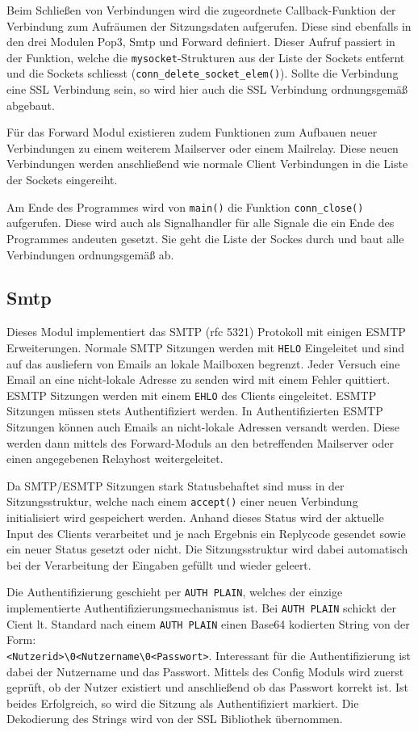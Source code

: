 \documentclass[final,a4paper,11pt,notitlepage,halfparskip]{scrreprt}
\begin{document}
Beim Schließen von Verbindungen wird die zugeordnete Callback-Funktion der
Verbindung zum Aufräumen der Sitzungsdaten aufgerufen. Diese sind ebenfalls in
den drei Modulen Pop3, Smtp und Forward definiert. Dieser Aufruf passiert in der
Funktion, welche die \texttt{mysocket}-Strukturen aus der Liste der Sockets
entfernt und die Sockets schliesst (\texttt{conn\_delete\_socket\_elem()}).
Sollte die Verbindung eine SSL Verbindung sein, so wird hier auch die SSL
Verbindung ordnungsgemäß abgebaut.

Für das Forward Modul existieren zudem Funktionen zum Aufbauen neuer Verbindungen
zu einem weiterem Mailserver oder einem Mailrelay. Diese neuen Verbindungen
werden anschließend wie normale Client Verbindungen in die Liste der Sockets
eingereiht.

Am Ende des Programmes wird von \texttt{main()} die Funktion 
\texttt{conn\_close()} aufgerufen. Diese wird auch als Signalhandler für alle
Signale die ein Ende des Programmes andeuten gesetzt. Sie geht die Liste der
Sockes durch und baut alle Verbindungen ordnungsgemäß ab.


\subsection{Smtp}
Dieses Modul implementiert das SMTP (rfc 5321) Protokoll mit einigen ESMTP 
Erweiterungen. Normale SMTP Sitzungen werden mit \texttt{HELO} Eingeleitet und
sind auf das ausliefern von Emails an lokale Mailboxen begrenzt. Jeder Versuch
eine Email an eine nicht-lokale Adresse zu senden wird mit einem Fehler
quittiert. ESMTP Sitzungen werden mit einem \texttt{EHLO} des Clients
eingeleitet. ESMTP Sitzungen müssen stets Authentifiziert werden. In
Authentifizierten ESMTP Sitzungen können auch Emails an nicht-lokale Adressen
versandt werden. Diese werden dann mittels des Forward-Moduls an den betreffenden
Mailserver oder einen angegebenen Relayhost weitergeleitet.

Da SMTP/ESMTP Sitzungen stark Statusbehaftet sind muss in der Sitzungsstruktur,
welche nach einem \texttt{accept()} einer neuen Verbindung initialisiert wird
gespeichert werden. Anhand dieses Status wird der aktuelle Input des Clients
verarbeitet und je nach Ergebnis ein Replycode gesendet sowie ein neuer Status 
gesetzt oder nicht. Die Sitzungsstruktur wird dabei automatisch bei der
Verarbeitung der Eingaben gefüllt und wieder geleert.

Die Authentifizierung geschieht per \texttt{AUTH PLAIN}, welches der einzige
implementierte Authentifizierungsmechanismus ist. Bei \texttt{AUTH PLAIN}
schickt der Cient lt. Standard nach einem \texttt{AUTH PLAIN} einen Base64
kodierten String von der Form:\\
\texttt{<Nutzerid>\textbackslash0<Nutzername\textbackslash0<Passwort>}. 
Interessant für die Authentifizierung ist dabei der Nutzername und das Passwort.
Mittels des Config Moduls wird zuerst geprüft, ob der Nutzer existiert und
anschließend ob das Passwort korrekt ist. Ist beides Erfolgreich, so wird die
Sitzung als Authentifiziert markiert. Die Dekodierung des Strings wird von der
SSL Bibliothek übernommen.
\end{document}
